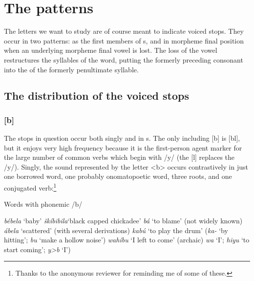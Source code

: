 \documentclass[output=paper]{LSP/langsci}
\begin{document}
\section{The patterns}

The letters we want to study are of course meant to indicate voiced stops. They occur in two patterns: as the first members of s, and in morpheme final position when an underlying morpheme final vowel is lost. The loss of the vowel restructures the syllables of the word, putting the formerly preceding consonant into the  of the formerly penultimate syllable.

\subsection{The distribution of the voiced stops}

\subsubsection{[b]}

The stops in question occur both singly and in s. The only  including [b] is [bl], but it enjoys very high frequency because it is the first-person agent marker for the large number of common verbs which begin with /y/ (the [l] replaces the /y/). Singly, the sound represented by the letter <b> occurs contrastively in just one borrowed word, one probably onomatopoetic word, three roots, and one conjugated verb:\footnote{Thanks to the anonymous reviewer for reminding me of some of these.}

\begin{exe} \label{ex:rood:1}
\ex Words with phonemic /b/
\begin{xlist}
\ex \textit{bébela} `baby'
\ex \textit{\v{s}kíbibila}`black capped chickadee'
\ex \textit{bá} `to blame' (not widely known)
\ex \textit{ábela} `scattered' (with several derivations)
\ex \textit{kabú} `to play the drum' (\textit{ka-} `by hitting'; \textit{bu} `make a hollow noise')
\ex \textit{wahíbu} `I left to come' (archaic) \textit{wa} `I'; \textit{hiyu} `to start coming'; \textit{y>b} `I')
\end{xlist}
\end{exe} 
\end{document}
